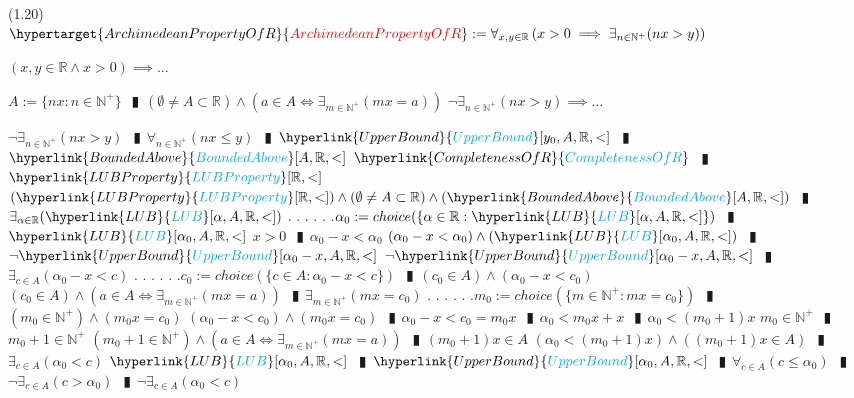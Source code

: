 \documentclass{book}
\newcommand{\df}[1]{\hypertarget{#1}{\textcolor{red}{#1}}}
\newcommand{\rf}[1]{\hyperlink{#1}{\textcolor{cyan}{#1}}}
\newcommand{\abr}{:=}
\newcommand{\cont}{\phantom{.}. . .\phantom{.}}
\newcommand{\pipe}{$\phantom{(}\vrectangleblack\phantom{)}$}
\newcommand{\pr}[1]{\left(#1\right)}
\begin{document}
(1.20) \\
$\df{ArchimedeanPropertyOfR} \abr \forall_{x, y \in \mathbb{R}}\pr{x > 0 \implies \exists_{n \in \mathbb{N}^+}(n x > y)}$
\begin{enumerate}
  \lit $(x, y \in \mathbb{R} \land x > 0) \implies \ldots$
  \begin{enumerate}
    \lit $A \abr \{n x : n \in \mathbb{N}^+\}$ \pipe $(\emptyset \neq A \subset \mathbb{R}) \land \pr{a \in A \iff \exists_{m \in \mathbb{N}^+}(m x = a)}$
    \lit $\lnot \exists_{n \in \mathbb{N}^+}(n x > y) \implies \ldots$
    \begin{enumerate}
      \lit $\lnot \exists_{n \in \mathbb{N}^+}(n x > y)$ \pipe $\forall_{n \in \mathbb{N}^+}(n x \leq y)$ \pipe $\rf{UpperBound}[y_0, A, \mathbb{R}, <]$ \pipe $\rf{BoundedAbove}[A, \mathbb{R}, <]$
      \lit $\rf{CompletenessOfR}$ \pipe $\rf{LUBProperty}[\mathbb{R}, <]$
      \lit $(\rf{LUBProperty}[\mathbb{R}, <]) \land (\emptyset \neq A \subset \mathbb{R}) \land (\rf{BoundedAbove}[A, \mathbb{R}, <])$ \pipe $\exists_{\alpha \in \mathbb{R}}(\rf{LUB}[\alpha, A, \mathbb{R}, <])$ \cont
      \lit \cont $\alpha_0 \abr choice(\{\alpha \in \mathbb{R} : \rf{LUB}[\alpha, A, \mathbb{R}, <]\})$ \pipe $\rf{LUB}[\alpha_0, A, \mathbb{R}, <]$
      \lit $x > 0$ \pipe $\alpha_0 - x < \alpha_0$
      \lit $(\alpha_0 - x < \alpha_0) \land (\rf{LUB}[\alpha_0, A, \mathbb{R}, <])$ \pipe $\lnot \rf{UpperBound}[\alpha_0 - x, A, \mathbb{R}, <]$
      \lit $\lnot \rf{UpperBound}[\alpha_0 - x, A, \mathbb{R}, <]$ \pipe $\exists_{c \in A}(\alpha_0 - x < c)$ \cont
      \lit \cont $c_0 \abr choice(\{c \in A : \alpha_0 - x < c\})$ \pipe $(c_0 \in A) \land (\alpha_0 - x < c_0)$
      \lit $(c_0 \in A) \land \pr{a \in A \iff \exists_{m \in \mathbb{N}^+}(m x = a)}$ \pipe $\exists_{m \in \mathbb{N}^+}(m x = c_0)$ \cont
      \lit \cont $m_0 \abr choice(\{m \in \mathbb{N}^+ : m x = c_0\})$ \pipe $(m_0 \in \mathbb{N}^+) \land (m_0 x = c_0)$
      \lit $(\alpha_0 - x < c_0) \land (m_0 x = c_0)$ \pipe $\alpha_0 - x < c_0 = m_0 x$ \pipe $\alpha_0 < m_0 x + x$ \pipe $\alpha_0 < (m_0 + 1) x$
      \lit $m_0 \in \mathbb{N}^+$ \pipe $m_0 + 1 \in \mathbb{N}^+$
      \lit $(m_0 + 1 \in \mathbb{N}^+) \land \pr{a \in A \iff \exists_{m \in \mathbb{N}^+}(m x = a)}$ \pipe $(m_0 + 1) x \in A$
      \lit $\pr{\alpha_0 < (m_0 + 1) x} \land \pr{(m_0 + 1) x \in A}$ \pipe $\exists_{c \in A}(\alpha_0 < c)$
      \lit $\rf{LUB}[\alpha_0, A, \mathbb{R}, <]$ \pipe $\rf{UpperBound}[\alpha_0, A, \mathbb{R}, <]$ \pipe $\forall_{c \in A}(c \leq \alpha_0)$ \pipe $\lnot \exists_{c \in A}(c > \alpha_0)$ \pipe $\lnot \exists_{c \in A}(\alpha_0 < c)$

\end{enumerate}
\end{enumerate}
\end{enumerate}
\end{document}
